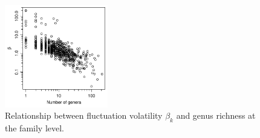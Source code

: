 \documentclass[12pt]{article}
\begin{document}
\begin{figure}[!hp]
  \centering
  \includegraphics[width=0.4\textwidth]{../../figSupp_betaByRich.pdf} 
  \caption{Relationship between fluctuation volatility $\beta_k$ and
    genus richness at the family level.}
  \label{figSupp:betaByRich}
\end{figure}


% 
\end{document}
